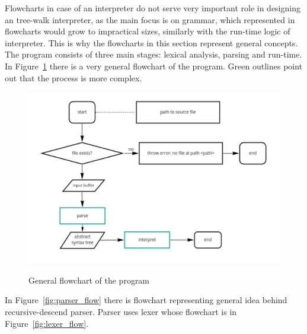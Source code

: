 \documentclass{article}
\begin{document}
    Flowcharts in case of an interpreter do not serve very important role in
    designing an tree-walk interpreter, as the main focus is on grammar, which 
    represented in flowcharts would grow to impractical sizes, similarly with
    the run-time logic of interpreter. This is why the flowcharts in this section
    represent general concepts.
    The program consists of three main stages: lexical analysis, parsing and 
    run-time. In Figure~\ref{fig:general_flow} there is a very general flowchart
    of the program. Green outlines point out that the process is more complex.
    \begin{figure}[H]
        \centering
        \caption{General flowchart of the program}
        \includegraphics[width=\linewidth]{general_flowchart}
        \label{fig:general_flow}
    \end{figure}
    In Figure~\ref{fig:parser_flow} there is flowchart representing general
    idea behind recursive-descend parser. Parser uses lexer whose flowchart
    is in Figure~\ref{fig:lexer_flow}.
\end{document}
